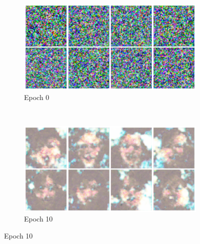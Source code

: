 \begin{figure}
    \centering
    \begin{subfigure}[b]{0.45\textwidth}
        \includegraphics[width=\textwidth]{fig/dcgan/ffhq/epoch0}
        \caption{Epoch 0}
    \end{subfigure}
    ~
    \begin{subfigure}[b]{0.45\textwidth}
        \includegraphics[width=\textwidth]{fig/dcgan/ffhq/epoch200}
        \caption{Epoch 10}
    \end{subfigure}


\end{figure}
